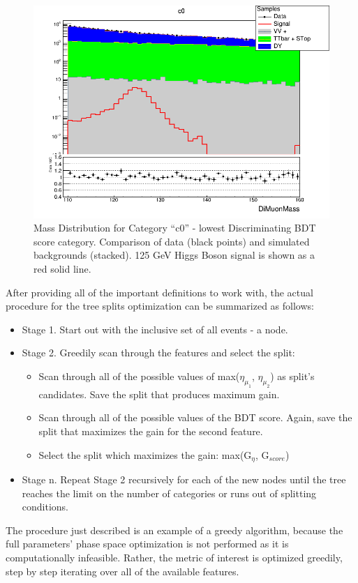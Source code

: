 \begin{figure}[htbp]
  \centering
  \includegraphics[width=0.9\linewidth]{figures/ch_higgs/distributions/bdt_uf/distribution__c0__DiMuonMass__logY.png}
  \caption{Mass Distribution for Category ``c0'' - lowest Discriminating BDT score category. Comparison of data (black points) and simulated backgrounds (stacked). 125 GeV Higgs Boson signal is shown as a red solid line.}
  \label{fig:higgs_categorization_massc0}
\end{figure}

After providing all of the important definitions to work with, the actual procedure for the tree splits optimization can be summarized as follows:
\begin{itemize}
  \item Stage 1. Start out with the inclusive set of all events - a node.
  \item Stage 2. Greedily scan through the features and select the split:
    \begin{itemize}
      \item Scan through all of the possible values of max($\eta_{\mu_1}$, $\eta_{\mu_2}$) as split's candidates. Save the split that produces maximum gain.
      \item Scan through all of the possible values of the BDT score. Again, save the split that maximizes the gain for the second feature.
      \item Select the split which maximizes the gain: max(G$_\eta$, G$_{score}$)
    \end{itemize}
  \item Stage n. Repeat Stage 2 recursively for each of the new nodes until the tree reaches the limit on the number of categories or runs out of splitting conditions.
\end{itemize}
The procedure just described is an example of a greedy algorithm, because the full parameters' phase space optimization is not performed as it is computationally infeasible. Rather, the metric of interest is optimized greedily, step by step iterating over all of the available features.

